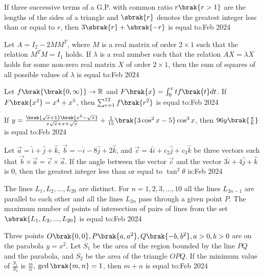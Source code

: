 \iffalse
   \title{Assignment}
   \author{EE24BTECH11034}
   \section{integer}
\fi 
    \item If three successive terms of a G.P. with common ratio $r\brak{r>1}$ are the lengths of the sides of a triangle and $\sbrak{r}$ denotes the greatest integer less than or equal to $r$, then $3\sbrak{r}+\sbrak{-r}$ is equal to:\hfill{Feb 2024}

       

    \item Let $A=I_{2}-2MM^{T}$, where $M$ is a real matrix of order $2\times1$ such that the relation $M^{T}M=I_{1}$ holds. If $\lambda$ is a real number such that the relation $AX=\lambda X$ holds for some non-zero real matrix $X$ of order $2\times1$, then the sum of squares of all possible values of $\lambda$ is equal to:\hfill{Feb 2024}

        
    \item Let $f\brak{\brak{0,\infty}}\rightarrow\mathbb{R}$ and $F\brak{x}=\int_{0}^{x}tf\brak{t}dt$. If $F\brak{x^{2}}=x^{4}+x^{5}$, then $\sum_{r=1}^{12}f\brak{r^{2}}$ is equal to:\hfill{Feb 2024}


    \item If $y=\frac{\brak{\sqrt{x}+1}\brak{x^{2}-\sqrt{x}}}{x\sqrt{x}+x+\sqrt{x}}+\frac{1}{15}\brak{3\cos^{2}x-5}\cos^{3}x$, then $96y\brak{\frac{\pi}{6}}$ is equal to:\hfill{Feb 2024}

       
    \item Let $\vec{a}=\hat{i}+\hat{j}+\hat{k}$, $\vec{b}=-\hat{i}-8\hat{j}+2\hat{k}$, and $\vec{c}=4\hat{i}+c_{2}\hat{j}+c_{3}\hat{k}$ be three vectors such that $\vec{b}\times\vec{a}=\vec{c}\times\vec{a}$. If the angle between the vector $\vec{c}$ and the vector $3\hat{i}+4\hat{j}+\hat{k}$ is $0$, then the greatest integer less than or equal to $\tan^{2}\theta$ is:\hfill{Feb 2024}

      
        

    \item The lines $L_{1}, L_{2}, \ldots, L_{20}$ are distinct. For $n=1, 2, 3, \ldots, 10$ all the lines $L_{2n-1}$ are parallel to each other and all the lines $L_{2n}$ pass through a given point $P$. The maximum number of points of intersection of pairs of lines from the set $\sbrak{L_{1},L_{2},...,L_{20}}$ is equal to:\hfill{Feb 2024}

      
    \item Three points $O\brak{0,0}, P\brak{a,a^{2}}, Q\brak{-b,b^{2}}, a>0, b>0$ are on the parabola $y=x^{2}$. Let $S_{1}$ be the area of the region bounded by the line $PQ$ and the parabola, and $S_{2}$ be the area of the triangle $OPQ$. If the minimum value of $\frac{S_{1}}{S_{2}}$ is $\frac{m}{n}$, $\gcd\brak{m,n}=1$, then $m+n$ is equal to:\hfill{Feb 2024}


